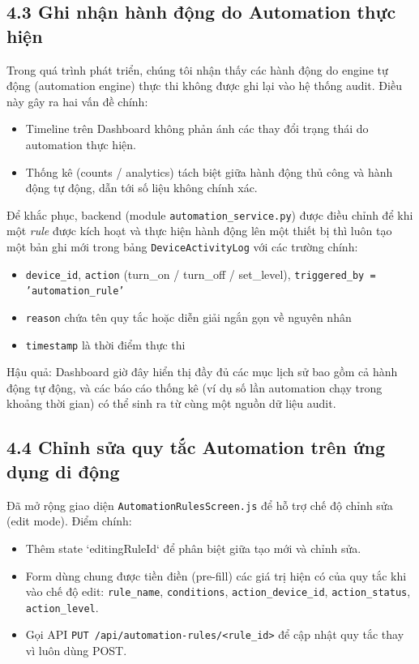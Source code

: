 \documentclass[12pt]{article}
\begin{document}
\setcounter{section}{4}
\setcounter{subsection}{2}

\subsection{4.3 Ghi nhận hành động do Automation thực hiện}
Trong quá trình phát triển, chúng tôi nhận thấy các hành động do engine tự động (automation engine) thực thi không được ghi lại vào hệ thống audit. Điều này gây ra hai vấn đề chính:
\begin{itemize}[noitemsep]
  \item Timeline trên Dashboard không phản ánh các thay đổi trạng thái do automation thực hiện.
  \item Thống kê (counts / analytics) tách biệt giữa hành động thủ công và hành động tự động, dẫn tới số liệu không chính xác.
\end{itemize}

Để khắc phục, backend (module \texttt{automation\_service.py}) được điều chỉnh để khi một \emph{rule} được kích hoạt và thực hiện hành động lên một thiết bị thì luôn tạo một bản ghi mới trong bảng \texttt{DeviceActivityLog} với các trường chính:
\begin{itemize}[noitemsep]
  \item \texttt{device\_id}, \texttt{action} (turn\_on / turn\_off / set\_level), \texttt{triggered\_by = 'automation\_rule'}
  \item \texttt{reason} chứa tên quy tắc hoặc diễn giải ngắn gọn về nguyên nhân
  \item \texttt{timestamp} là thời điểm thực thi
\end{itemize}

Hậu quả: Dashboard giờ đây hiển thị đầy đủ các mục lịch sử bao gồm cả hành động tự động, và các báo cáo thống kê (ví dụ số lần automation chạy trong khoảng thời gian) có thể sinh ra từ cùng một nguồn dữ liệu audit.

\subsection{4.4 Chỉnh sửa quy tắc Automation trên ứng dụng di động}
Đã mở rộng giao diện \texttt{AutomationRulesScreen.js} để hỗ trợ chế độ chỉnh sửa (edit mode). Điểm chính:
\begin{itemize}[noitemsep]
  \item Thêm state `editingRuleId` để phân biệt giữa tạo mới và chỉnh sửa.
  \item Form dùng chung được tiền điền (pre-fill) các giá trị hiện có của quy tắc khi vào chế độ edit: \texttt{rule\_name}, \texttt{conditions}, \texttt{action\_device\_id}, \texttt{action\_status}, \texttt{action\_level}.
  \item Gọi API \texttt{PUT /api/automation-rules/<rule\_id>} để cập nhật quy tắc thay vì luôn dùng POST.
\end{itemize}
\end{document}
